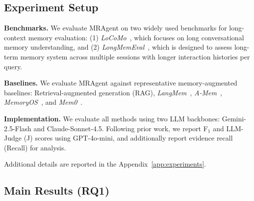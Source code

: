 \documentclass{llmxive}
\begin{document}
\subsection{Experiment Setup}
\textbf{Benchmarks.} 
We evaluate MRAgent on two widely used benchmarks for long-context memory evaluation:
(1) \emph{LoCoMo}~\cite{DBLP:conf/acl/MaharanaLTBBF24}, which focuses on long conversational memory understanding, and 
(2) \emph{LongMemEval}~\cite{DBLP:conf/iclr/WuWYZCY25}, which is designed to assess long-term memory system across multiple sessions with longer interaction histories per query.

\textbf{Baselines.} 
We evaluate MRAgent against representative memory-augmented baselines: Retrieval-augmented generation (RAG), \emph{LangMem}~\cite{langmem2025}, \emph{A-Mem}~\cite{DBLP:journals/corr/abs-2502-12110}, \emph{MemoryOS}~\cite{DBLP:journals/corr/abs-2506-06326}, and \emph{Mem0}~\cite{DBLP:journals/corr/abs-2504-19413}.

\textbf{Implementation.} 
We evaluate all methods using two LLM backbones: Gemini-2.5-Flash and Claude-Sonnet-4.5. 
Following prior work, we report F$_1$ and LLM-Judge (J) scores using GPT-4o-mini, and additionally report evidence recall (Recall) for analysis.

Additional details are reported in the Appendix~\ref{app:experiments}.


\subsection{Main Results (RQ1)}
\end{document}
